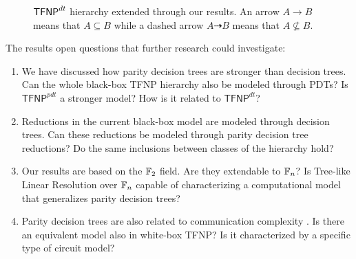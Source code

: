 \begin{figure}[H]

    
    \caption{$\mathsf{TFNP}^{dt}$ hierarchy extended through our results. An arrow $A \to B$ means that $A \subseteq B$ while a dashed arrow $A \dashrightarrow B$ means that $A \not\subseteq B$.}   
\end{figure} 

\newpage

\newpage

The results open questions that further research could investigate:
\begin{enumerate}
    \item We have discussed how parity decision trees are stronger than decision trees. Can the whole black-box \textsf{TFNP} hierarchy also be modeled through PDTs? Is $\mathsf{TFNP}^{pdt}$ a stronger model? How is it related to $\mathsf{TFNP}^{dt}$?
    \item Reductions in the current black-box model are modeled through decision trees. Can these reductions be modeled through parity decision tree reductions? Do the same inclusions between classes of the hierarchy hold?
    \item Our results are based on the $\mathbb{F}_2$ field. Are they extendable to $\mathbb{F}_n$? Is Tree-like Linear Resolution over $\mathbb{F}_n$ capable of characterizing a computational model that generalizes parity decision trees?
    \item Parity decision trees are also related to communication complexity \cite{parity_complexity, pdts_comm_compl}. Is there an equivalent model also in white-box \textsf{TFNP}? Is it characterized by a specific type of circuit model?
\end{enumerate}